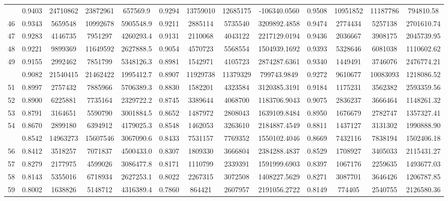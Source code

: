 \documentclass[
  12pt,
]{article}
\begin{document}
\begin{longtable}[t]{lcccccccccccc}
\addlinespace
45 & 0.9403 & 24710862 & 23872961 & 657569.9 & 0.9294 & 13759010 & 12685175 & -106340.0560 & 0.9508 & 10951852 & 11187786 & 794810.58\\
46 & 0.9343 & 5659548 & 10992678 & 5905548.9 & 0.9211 & 2885114 & 5735540 & 3209892.4858 & 0.9474 & 2774434 & 5257138 & 2701610.74\\
47 & 0.9283 & 4146735 & 7951297 & 4260293.4 & 0.9131 & 2110068 & 4043122 & 2217129.0194 & 0.9436 & 2036667 & 3908175 & 2045739.95\\
48 & 0.9221 & 9899369 & 11649592 & 2627888.5 & 0.9054 & 4570723 & 5568554 & 1504939.1692 & 0.9393 & 5328646 & 6081038 & 1110602.62\\
49 & 0.9155 & 2992462 & 7851799 & 5348126.3 & 0.8981 & 1542971 & 4105723 & 2874287.6361 & 0.9340 & 1449491 & 3746076 & 2476774.21\\
\addlinespace
50 & 0.9082 & 21540415 & 21462422 & 1995412.7 & 0.8907 & 11929738 & 11379329 & 799743.9849 & 0.9272 & 9610677 & 10083093 & 1218086.52\\
51 & 0.8997 & 2757432 & 7885966 & 5706389.3 & 0.8830 & 1582201 & 4323584 & 3120385.3191 & 0.9184 & 1175231 & 3562382 & 2593359.56\\
52 & 0.8900 & 6225881 & 7735164 & 2329722.2 & 0.8745 & 3389644 & 4068700 & 1183706.9043 & 0.9075 & 2836237 & 3666464 & 1148261.32\\
53 & 0.8791 & 3164651 & 5590790 & 3001884.5 & 0.8652 & 1487972 & 2808043 & 1639109.8484 & 0.8950 & 1676679 & 2782747 & 1357327.41\\
54 & 0.8670 & 2899180 & 6394912 & 4179025.3 & 0.8548 & 1462053 & 3263610 & 2184887.4549 & 0.8811 & 1437127 & 3131302 & 1990888.90\\
\addlinespace
55 & 0.8542 & 14963273 & 15607546 & 3067090.6 & 0.8433 & 7531157 & 7769352 & 1550102.4046 & 0.8669 & 7432116 & 7838194 & 1502406.18\\
56 & 0.8412 & 3518257 & 7071837 & 4500433.0 & 0.8307 & 1809330 & 3666804 & 2384288.4837 & 0.8529 & 1708927 & 3405033 & 2115431.27\\
57 & 0.8279 & 2177975 & 4599026 & 3086477.8 & 0.8171 & 1110799 & 2339391 & 1591999.6903 & 0.8397 & 1067176 & 2259635 & 1493677.03\\
58 & 0.8143 & 5355016 & 6718934 & 2627253.1 & 0.8022 & 2267315 & 3072508 & 1408227.5629 & 0.8271 & 3087701 & 3646426 & 1206787.85\\
59 & 0.8002 & 1638826 & 5148712 & 4316389.4 & 0.7860 & 864421 & 2607957 & 2191056.2722 & 0.8149 & 774405 & 2540755 & 2126580.36\\

\end{longtable}
\end{document}
